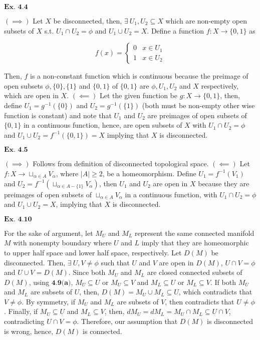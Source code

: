 \documentclass{article}
\begin{document}
\vspace{0.2in}

${\textbf{Ex. 4.4}}$

$(\implies)$ Let $X$ be disconnected, then, $\exists\ U_1, U_2 \subseteq X$ which are non-empty open subsets of $X$ s.t. $U_1 \cap U_2 = \phi$ and $U_1 \cup U_2 = X$. Define a function $f:X \rightarrow \{0,1\}$ as 

$$f(x) = \left\{\begin{matrix}0 & x \in U_1\\1 & x \in U_2\end{matrix}\right.$$

Then, $f$ is a non-constant function which is continuous because the preimage of open subsets $\phi, \{0\}, \{1\}$ and $\{0,1\}$ of $\{0,1\}$ are $\phi,U_1,U_2$ and $X$ respectively, which are open in $X$. $(\impliedby)$ Let the given function be $g:X \rightarrow \{0,1\}$, then, define $U_1 = g^{-1}(\{0\})$ and $U_2 = g^{-1}(\{1\})$ (both must be non-empty other wise function is constant) and note that $U_1$ and $U_2$ are preimages of open subsets of $\{0,1\}$ in a continuous function, hence, are open subsets of $X$ with $U_1 \cap U_2 = \phi$ and $U_1 \cup U_2 = f^{-1}(\{0,1\}) = X$ implying that $X$ is disconnected.

\vspace{0.2in}

${\textbf{Ex. 4.5}}$

$(\implies)$ Follows from definition of disconnected topological space. $(\impliedby)$ Let $f: X \rightarrow \sqcup_{\alpha \in A}V_{\alpha}$, where $|A| \geq 2$, be a homeomorphism. Define $U_1 = f^{-1}(V_1)$ and $U_2 = f^{-1}(\sqcup_{\alpha \in A - \{1\}}V_{\alpha})$, then $U_1$ and $U_2$ are open in $X$ because they are preimages of open subsets of $\sqcup_{\alpha \in A}V_{\alpha}$ in a continuous function, with $U_1 \cap U_2 = \phi$ and $U_1 \cup U_2 = X$, implying that $X$ is disconnected.

\vspace{0.2in}

${\textbf{Ex. 4.10}}$

For the sake of argument, let $M_U$ and $M_L$ represent the same connected manifold $M$ with nonempty boundary where $U$ and $L$ imply that they are homeomorphic to upper half space and lower half space, respectively. Let $D(M)$ be disconnected. Then, $\exists\ U,V \neq \phi$ such that $U$ and $V$ are open in $D(M)$, $U \cap V = \phi$ and $U \cup V = D(M)$. Since both $M_U$ and $M_L$ are closed connected subsets of $D(M)$, using $\textbf{4.9(a)}$, $M_U \subseteq U$ or $M_U \subseteq V$ and $M_L \subseteq U$ or $M_L \subseteq V$. If both $M_U$ and $M_L$ are subsets of $U$, then, $D(M) = M_U \cup M_L \subseteq U$, which contradicts that $V \neq \phi$. By symmetry, if $M_U$ and $M_L$ are subsets of $V$, then contradicts that $U \neq \phi$. Finally, if $M_U \subseteq U$ and $M_L \subseteq V$, then, $dM_U = dM_L = M_U \cap M_L \subseteq U \cap V$, contradicting $U \cap V = \phi$. Therefore, our assumption that $D(M)$ is disconnected is wrong, hence, $D(M)$ is connected.
\end{document}
